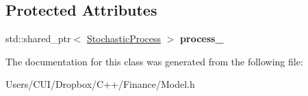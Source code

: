 \subsection*{Protected Attributes}
\begin{DoxyCompactItemize}
\item 
\hypertarget{class_model1_d_ad646c53c0c7d97d7699ccf4d77e22bf2}{}\label{class_model1_d_ad646c53c0c7d97d7699ccf4d77e22bf2} 
std\+::shared\+\_\+ptr$<$ \hyperlink{class_stochastic_process}{Stochastic\+Process} $>$ {\bfseries process\+\_\+}
\end{DoxyCompactItemize}


The documentation for this class was generated from the following file\+:\begin{DoxyCompactItemize}
\item 
Users/\+C\+U\+I/\+Dropbox/\+C++/\+Finance/Model.\+h\end{DoxyCompactItemize}
